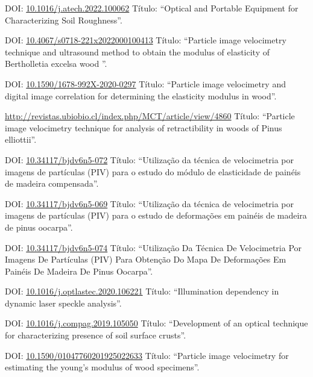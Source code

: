 \documentclass[11pt,a4paper,sans]{moderncv} %
\newcommand{\doiurl}[1]{\href{https://doi.org/#1}{#1}}
\begin{document}
	      {DOI: \doiurl{10.1016/j.atech.2022.100062} }{}{}
	      {Título: ``Optical and Portable Equipment for Characterizing Soil Roughness''.}
	      
	      {DOI: \doiurl{10.4067/s0718-221x2022000100413} }{}{}
	      {Título: ``Particle image velocimetry technique and ultrasound method to obtain the modulus of elasticity of Bertholletia excelsa wood ''.}
	      
	      {DOI: \doiurl{10.1590/1678-992X-2020-0297} }{}{}
	      {Título: ``Particle image velocimetry and digital image correlation for determining the elasticity modulus in wood''.}
	      
	      {\url{http://revistas.ubiobio.cl/index.php/MCT/article/view/4860}}{}{}
	      {Título: ``Particle image velocimetry technique for analysis of retractibility in woods of Pinus elliottii''.}
	      
	      {DOI: \doiurl{10.34117/bjdv6n5-072}}{}{}
	      {Título: ``Utilização da técnica de velocimetria por imagens de partículas (PIV) para o estudo do módulo de elasticidade de painéis de madeira compensada''.}

	      {DOI: \doiurl{10.34117/bjdv6n5-069}}{}{}
	      {Título: ``Utilização da técnica de velocimetria por imagens de partículas (PIV) para o estudo de deformações em painéis de madeira de pinus oocarpa''.}


	      {DOI: \doiurl{10.34117/bjdv6n5-074}}{}{}
	      {Título: ``Utilização Da Técnica De Velocimetria Por Imagens De Partículas (PIV) Para Obtenção Do Mapa De Deformações Em Painéis De Madeira De Pinus Oocarpa''.}

	      {DOI: \doiurl{10.1016/j.optlastec.2020.106221}}{}{}
	      {Título: ``Illumination dependency in dynamic laser speckle analysis''.}


	      {DOI: \doiurl{10.1016/j.compag.2019.105050}}{}{}
	      {Título: ``Development of an optical technique for characterizing presence of soil surface crusts''.}


	      {DOI: \doiurl{10.1590/01047760201925022633}}{}{}
	      {Título: ``Particle image velocimetry for estimating the young’s modulus of wood specimens''.}
\end{document}
